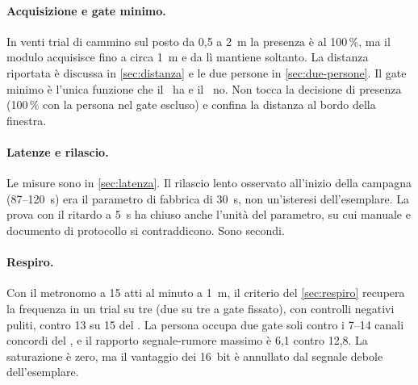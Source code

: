 \paragraph{Acquisizione e gate minimo.} In venti trial di cammino sul posto da 0,5
a 2~m la presenza è al 100\,\%, ma il modulo acquisisce fino a circa 1~m e da lì
mantiene soltanto. La distanza riportata è discussa in \cref{sec:distanza} e le due
persone in \cref{sec:due-persone}. Il gate minimo è l'unica funzione che il \ldc\ ha e
il \ldb\ no. Non tocca la decisione di presenza (100\,\% con la persona nel gate
escluso) e confina la distanza al bordo della finestra.

\paragraph{Latenze e rilascio.} Le misure sono in \cref{sec:latenza}. Il rilascio
lento osservato all'inizio della campagna (87--120~s) era il parametro di fabbrica di
30~s, non un'isteresi dell'esemplare. La prova con il ritardo a 5~s ha chiuso anche
l'unità del parametro, su cui manuale e documento di protocollo si contraddicono.
Sono secondi.

\paragraph{Respiro.} Con il metronomo a 15 atti al minuto a 1~m, il criterio del
\cref{sec:respiro} recupera la frequenza in un trial su tre (due su tre a gate
fissato), con controlli negativi puliti, contro 13 su 15 del \ldb. La persona occupa
due gate soli contro i 7--14 canali concordi del \ldb, e il rapporto segnale-rumore
massimo è 6,1 contro 12,8. La saturazione è zero, ma il vantaggio dei 16~bit è
annullato dal segnale debole dell'esemplare.

